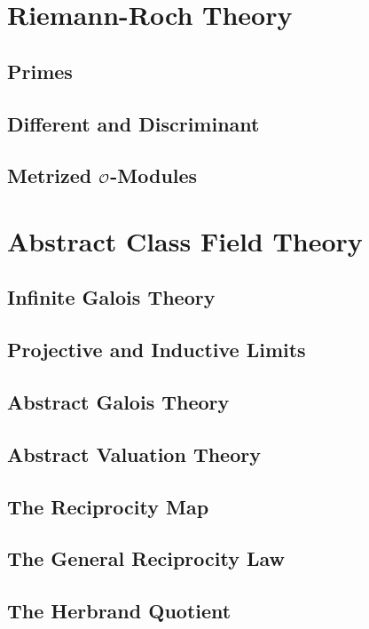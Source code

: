 \documentclass[oneside]{amsbook}
\numberwithin{ex}{section}
\begin{document}
\chapter{Riemann-Roch Theory}
\section{Primes}

\section{Different and Discriminant}

\setcounter{section}{3}
\section{Metrized $\mathcal{O}$-Modules}


\chapter{Abstract Class Field Theory}
\section{Infinite Galois Theory}

\section{Projective and Inductive Limits}

\section{Abstract Galois Theory}

\section{Abstract Valuation Theory}

\section{The Reciprocity Map}

\section{The General Reciprocity Law}

\section{The Herbrand Quotient}

\end{document}
